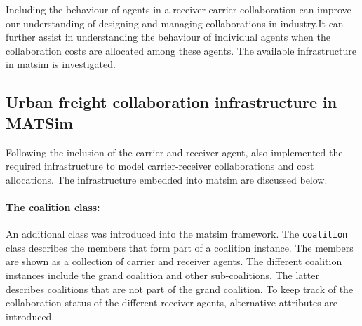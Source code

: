 Including the behaviour of agents in a receiver-carrier collaboration can improve our understanding of designing and managing collaborations in industry.It can further assist in understanding the behaviour of individual agents when the collaboration costs are allocated among these agents. The available infrastructure in \acrshort{matsim} is investigated.


\subsection{Urban freight collaboration infrastructure in MATSim}
\label{collaboration_infrastructure}
Following the inclusion of the carrier and receiver agent, \citet{bean2020behavioural} also implemented the required infrastructure to model carrier-receiver collaborations and cost allocations. The infrastructure embedded into \acrshort{matsim} are discussed below.

\paragraph{The coalition class:} An additional class was introduced into the \acrshort{matsim} framework. The \texttt{coalition} class describes the members that form part of a coalition instance. The members are shown as a collection of carrier and receiver agents. The different coalition instances include the grand coalition and other sub-coalitions. The latter describes coalitions that are not part of the grand coalition. To keep track of the collaboration status of the different receiver agents, alternative attributes are introduced.

